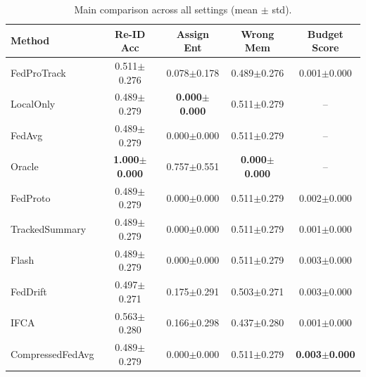\begin{table}[t]
\centering
\caption{Main comparison across all settings (mean $\pm$ std).}
\label{tab:main}
\begin{tabular}{lcccc}
\toprule
Method & Re-ID Acc & Assign Ent & Wrong Mem & Budget Score \\
\midrule
FedProTrack & 0.511$\pm$0.276 & 0.078$\pm$0.178 & 0.489$\pm$0.276 & 0.001$\pm$0.000 \\
LocalOnly & 0.489$\pm$0.279 & \textbf{0.000$\pm$0.000} & 0.511$\pm$0.279 & -- \\
FedAvg & 0.489$\pm$0.279 & 0.000$\pm$0.000 & 0.511$\pm$0.279 & -- \\
Oracle & \textbf{1.000$\pm$0.000} & 0.757$\pm$0.551 & \textbf{0.000$\pm$0.000} & -- \\
FedProto & 0.489$\pm$0.279 & 0.000$\pm$0.000 & 0.511$\pm$0.279 & 0.002$\pm$0.000 \\
TrackedSummary & 0.489$\pm$0.279 & 0.000$\pm$0.000 & 0.511$\pm$0.279 & 0.001$\pm$0.000 \\
Flash & 0.489$\pm$0.279 & 0.000$\pm$0.000 & 0.511$\pm$0.279 & 0.003$\pm$0.000 \\
FedDrift & 0.497$\pm$0.271 & 0.175$\pm$0.291 & 0.503$\pm$0.271 & 0.003$\pm$0.000 \\
IFCA & 0.563$\pm$0.280 & 0.166$\pm$0.298 & 0.437$\pm$0.280 & 0.001$\pm$0.000 \\
CompressedFedAvg & 0.489$\pm$0.279 & 0.000$\pm$0.000 & 0.511$\pm$0.279 & \textbf{0.003$\pm$0.000} \\
\bottomrule
\end{tabular}
\end{table}